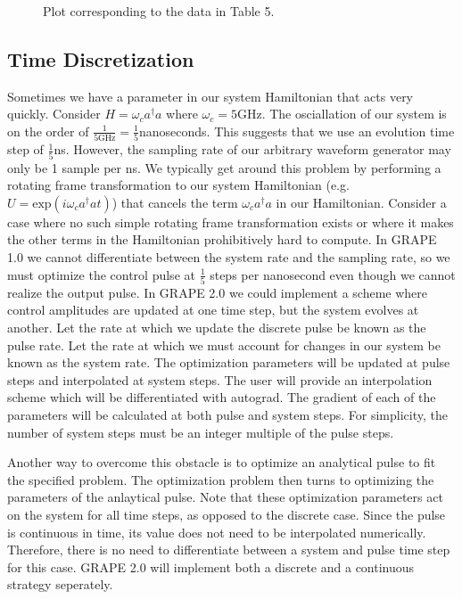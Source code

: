 \documentclass[letterpaper, 12pt]{article}
\begin{document}
\begin{figure}
  \caption{Plot corresponding to the data in Table 5.}
\end{figure}

\subsection{Time Discretization}
Sometimes we have a parameter in our system Hamiltonian that acts very quickly. Consider $H = \omega_{c}a^{\dagger}a$ where $\omega_{c} = 5$GHz. The osciallation of our system is on the order of $\frac{1}{5\textrm{GHz}} = \frac{1}{5}$nanoseconds. This suggests that we use an evolution time step of $\frac{1}{5}$ns. However, the sampling rate of our arbitrary waveform generator may only be 1 sample per ns. We typically get around this problem by performing a rotating frame transformation to our system Hamiltonian (e.g. $U=\textrm{exp}(i\omega_{c}a^{\dagger}at)$) that cancels the term $\omega_{c}a^{\dagger}a$ in our Hamiltonian. Consider a case where no such simple rotating frame transformation exists or where it makes the other terms in the Hamiltonian prohibitively hard to compute. In GRAPE 1.0 we cannot differentiate between the system rate and the sampling rate, so we must optimize the control pulse at $\frac{1}{5}$ steps per nanosecond even though we cannot realize the output pulse. In GRAPE 2.0 we could implement a scheme where control amplitudes are updated at one time step, but the system evolves at another. Let the rate at which we update the discrete pulse be known as the pulse rate. Let the rate at which we must account for changes in our system be known as the system rate. The optimization parameters will be updated at pulse steps and interpolated at system steps. The user will provide an interpolation scheme which will be differentiated with autograd. The gradient of each of the parameters will be calculated at both pulse and system steps. For simplicity, the number of system steps must be an integer multiple of the pulse steps.

Another way to overcome this obstacle is to optimize an analytical pulse to fit the specified problem. The optimization problem then turns to optimizing the parameters of the anlaytical pulse. Note that these optimization parameters act on the system for all time steps, as opposed to the discrete case. Since the pulse is continuous in time, its value does not need to be interpolated numerically. Therefore, there is no need to differentiate between a system and pulse time step for this case. GRAPE 2.0 will implement both a discrete and a continuous strategy seperately.
\end{document}
